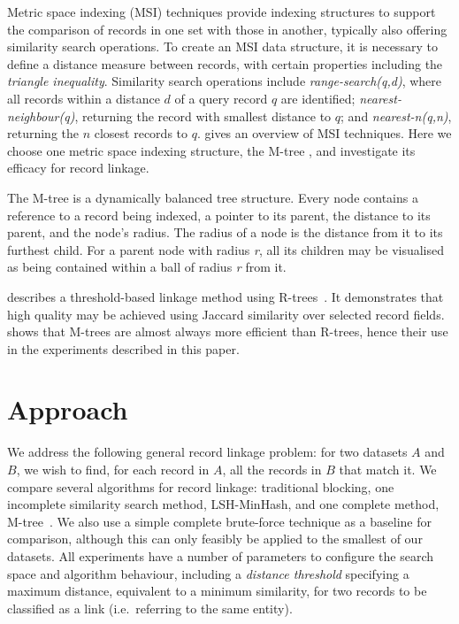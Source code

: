 \documentclass{llncs}
\begin{document}
Metric space indexing (MSI) techniques provide indexing structures to
support the comparison of records in one set with those in another,
typically also offering similarity search operations. To create an MSI
data structure, it is necessary to define a distance measure between
records, with certain properties including the \emph{triangle
inequality}. Similarity search operations include
\textit{range-search(q,d)}, where all records within a distance $d$ of a
query record $q$ are identified; \textit{nearest-neighbour(q)},
returning the record with smallest distance to $q$; and
\textit{nearest-n(q,n)}, returning the $n$ closest records to $q$.
\cite{Zezula2010} gives an overview of MSI techniques.
Here we choose one metric space indexing structure, the M-tree
\cite{paolociaccia2m}, and investigate its efficacy for record linkage.

The M-tree is a dynamically balanced tree structure. Every node contains
a reference to a record being indexed, a pointer to its parent, the
distance to its parent, and the node's radius. The radius of a node is
the distance from it to its furthest child. For a parent node with
radius \textit{r}, all its children may be visualised as being contained
within a ball of radius \textit{r} from it.

\cite{Li2006} describes a threshold-based linkage method
using R-trees~\cite{Hjaltason1998}. It demonstrates that high quality
may be achieved using Jaccard similarity over selected record fields.
\cite{Ciaccia97indexingmetric} shows that M-trees are
almost always more efficient than R-trees, hence their use in the
experiments described in this paper.


\section{Approach}
\label{sec-approach}

We address the following general record linkage problem: for two
datasets $A$ and $B$, we wish to find, for each record in $A$, all the
records in $B$ that match it. We compare several algorithms for record
linkage: traditional blocking, one incomplete similarity search method,
LSH-MinHash, and one complete method, M-tree~\cite{paolociaccia2m}. We
also use a simple complete brute-force technique as a baseline for
comparison, although this can only feasibly be applied to the smallest
of our datasets. All experiments have a number of parameters to
configure the search space and algorithm behaviour, including a
\emph{distance threshold} specifying a maximum distance, equivalent to a
minimum similarity, for two records to be classified as a link (i.e.\
referring to the same entity).
\end{document}

